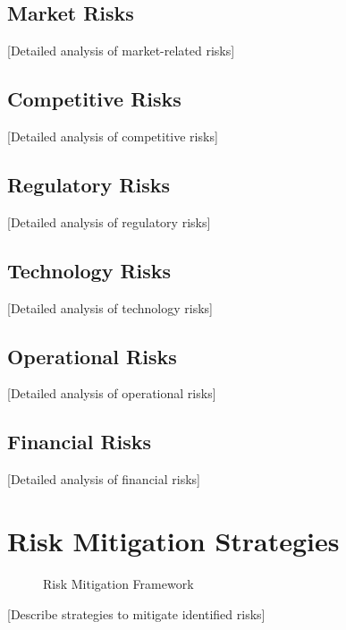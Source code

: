 \documentclass[11pt,letterpaper]{report}
\begin{document}
\subsection{Market Risks}
[Detailed analysis of market-related risks]

\subsection{Competitive Risks}
[Detailed analysis of competitive risks]

\subsection{Regulatory Risks}
[Detailed analysis of regulatory risks]

\subsection{Technology Risks}
[Detailed analysis of technology risks]

\subsection{Operational Risks}
[Detailed analysis of operational risks]

\subsection{Financial Risks}
[Detailed analysis of financial risks]

\section{Risk Mitigation Strategies}


\begin{figure}[htbp]
\centering
\caption{Risk Mitigation Framework}
\label{fig:risk_mitigation}
\end{figure}

[Describe strategies to mitigate identified risks]
\end{document}

